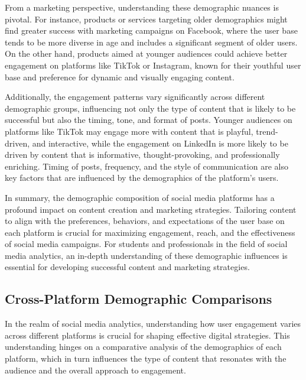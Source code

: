 \documentclass[
]{book}
\begin{document}
From a marketing perspective, understanding these demographic nuances is pivotal. For instance, products or services targeting older demographics might find greater success with marketing campaigns on Facebook, where the user base tends to be more diverse in age and includes a significant segment of older users. On the other hand, products aimed at younger audiences could achieve better engagement on platforms like TikTok or Instagram, known for their youthful user base and preference for dynamic and visually engaging content.

Additionally, the engagement patterns vary significantly across different demographic groups, influencing not only the type of content that is likely to be successful but also the timing, tone, and format of posts. Younger audiences on platforms like TikTok may engage more with content that is playful, trend-driven, and interactive, while the engagement on LinkedIn is more likely to be driven by content that is informative, thought-provoking, and professionally enriching. Timing of posts, frequency, and the style of communication are also key factors that are influenced by the demographics of the platform's users.

In summary, the demographic composition of social media platforms has a profound impact on content creation and marketing strategies. Tailoring content to align with the preferences, behaviors, and expectations of the user base on each platform is crucial for maximizing engagement, reach, and the effectiveness of social media campaigns. For students and professionals in the field of social media analytics, an in-depth understanding of these demographic influences is essential for developing successful content and marketing strategies.

\hypertarget{cross-platform-demographic-comparisons}{%
\subsection*{Cross-Platform Demographic Comparisons}\label{cross-platform-demographic-comparisons}}

In the realm of social media analytics, understanding how user engagement varies across different platforms is crucial for shaping effective digital strategies. This understanding hinges on a comparative analysis of the demographics of each platform, which in turn influences the type of content that resonates with the audience and the overall approach to engagement.
\end{document}
